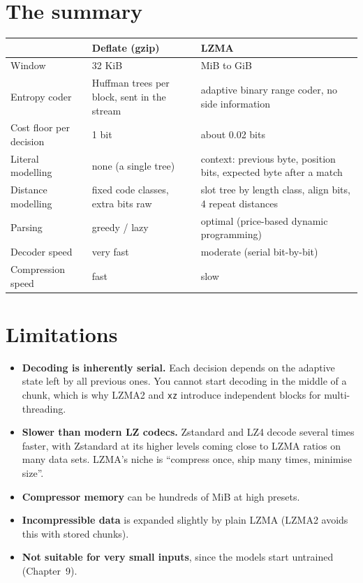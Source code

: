 \documentclass[11pt,a4paper,oneside]{book}
\begin{document}
\section{The summary}

\begin{center}
\small
\begin{tabular}{p{3.6cm}p{5.2cm}p{5.2cm}}
\toprule
 & Deflate (gzip) & LZMA\\
\midrule
Window & 32 KiB & MiB to GiB\\
Entropy coder & Huffman trees per block, sent in the stream & adaptive binary range coder, no side information\\
Cost floor per decision & 1 bit & about 0.02 bits\\
Literal modelling & none (a single tree) & context: previous byte, position bits, expected byte after a match\\
Distance modelling & fixed code classes, extra bits raw & slot tree by length class, align bits, 4 repeat distances\\
Parsing & greedy / lazy & optimal (price-based dynamic programming)\\
Decoder speed & very fast & moderate (serial bit-by-bit)\\
Compression speed & fast & slow\\
\bottomrule
\end{tabular}
\end{center}

\section{Limitations}

\begin{itemize}
\item \textbf{Decoding is inherently serial.} Each decision depends on the adaptive state left by all previous ones. You cannot start decoding in the middle of a chunk, which
is why LZMA2 and \texttt{xz} introduce independent blocks for multi-threading.
\item \textbf{Slower than modern LZ codecs.} Zstandard and LZ4 decode several times faster, with Zstandard at its higher levels coming close to LZMA ratios on many data sets.
LZMA's niche is ``compress once, ship many times, minimise size''.
\item \textbf{Compressor memory} can be hundreds of MiB at high presets.
\item \textbf{Incompressible data} is expanded slightly by plain LZMA (LZMA2 avoids this with stored chunks).
\item \textbf{Not suitable for very small inputs}, since the models start untrained (Chapter~9).
\end{itemize}
\end{document}
